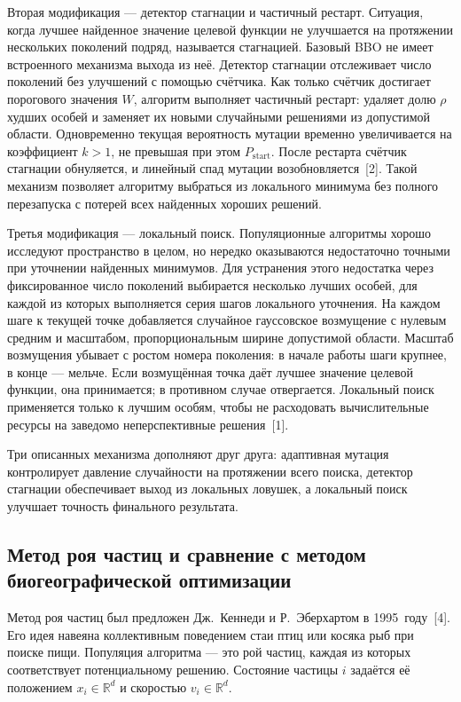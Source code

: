 \documentclass[14pt, russian]{scrartcl}
\begin{document}
Вторая модификация --- детектор стагнации и частичный рестарт.
Ситуация, когда лучшее найденное значение целевой функции не улучшается
на протяжении нескольких поколений подряд, называется стагнацией.
Базовый BBO не имеет встроенного механизма выхода из неё. Детектор
стагнации отслеживает число поколений без улучшений с помощью счётчика.
Как только счётчик достигает порогового значения $W$, алгоритм
выполняет частичный рестарт: удаляет долю $\rho$ худших особей и
заменяет их новыми случайными решениями из допустимой области.
Одновременно текущая вероятность мутации временно увеличивается на
коэффициент $k > 1$, не превышая при этом $P_{\text{start}}$. После
рестарта счётчик стагнации обнуляется, и линейный спад мутации
возобновляется~[2]. Такой механизм позволяет алгоритму выбраться из
локального минимума без полного перезапуска с потерей всех найденных
хороших решений.

Третья модификация --- локальный поиск. Популяционные алгоритмы хорошо
исследуют пространство в целом, но нередко оказываются недостаточно
точными при уточнении найденных минимумов. Для устранения этого
недостатка через фиксированное число поколений выбирается несколько
лучших особей, для каждой из которых выполняется серия шагов локального
уточнения. На каждом шаге к текущей точке добавляется случайное
гауссовское возмущение с нулевым средним и масштабом, пропорциональным
ширине допустимой области. Масштаб возмущения убывает с ростом номера
поколения: в начале работы шаги крупнее, в конце --- мельче. Если
возмущённая точка даёт лучшее значение целевой функции, она
принимается; в противном случае отвергается. Локальный поиск
применяется только к лучшим особям, чтобы не расходовать вычислительные
ресурсы на заведомо неперспективные решения~[1].

Три описанных механизма дополняют друг друга: адаптивная мутация
контролирует давление случайности на протяжении всего поиска, детектор
стагнации обеспечивает выход из локальных ловушек, а локальный поиск
улучшает точность финального результата.

\subsection{Метод роя частиц и сравнение с методом биогеографической оптимизации}

Метод роя частиц был предложен Дж.~Кеннеди и Р.~Эберхартом в
1995~году~[4]. Его идея навеяна коллективным поведением стаи птиц или
косяка рыб при поиске пищи. Популяция алгоритма --- это рой частиц,
каждая из которых соответствует потенциальному решению. Состояние
частицы $i$ задаётся её положением $x_i \in \mathbb{R}^d$ и скоростью
$v_i \in \mathbb{R}^d$.
\end{document}
